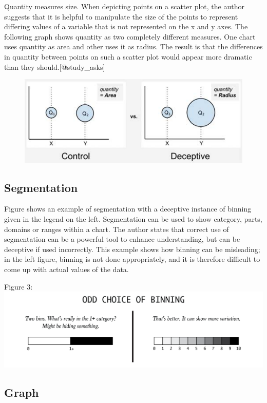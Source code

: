 \documentclass[]{book}
\theoremstyle{definition}
\theoremstyle{definition}
\theoremstyle{definition}
\theoremstyle{remark}
\begin{document}
Quantity measures size. When depicting points on a scatter plot, the
author suggests that it is helpful to manipulate the size of the points
to represent differing values of a variable that is not represented on
the x and y axes. The following graph shows quantity as two completely
different measures. One chart uses quantity as area and other uses it as
radius. The result is that the differences in quantity between points on
such a scatter plot would appear more dramatic than they
should.{[}@study\_asks{]}

\begin{figure}
\centering
\includegraphics{images/Quantity1.png}
\caption{}
\end{figure}

\subsection{Segmentation}\label{segmentation}

Figure shows an example of segmentation with a deceptive instance of
binning given in the legend on the left. Segmentation can be used to
show category, parts, domains or ranges within a chart. The author
states that correct use of segmentation can be a powerful tool to
enhance understanding, but can be deceptive if used incorrectly. This
example shows how binning can be misleading; in the left figure, binning
is not done appropriately, and it is therefore difficult to come up with
actual values of the data.

Figure 3: \includegraphics{images/Segmentation1.png}

\subsection{Graph}\label{graph}
\end{document}
